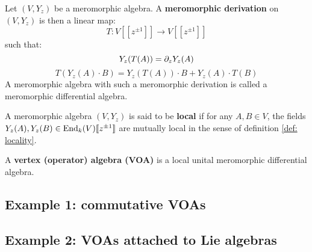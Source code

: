         \begin{definition} \label{def: meromorphic_differential_algebras}
            Let $(V, Y_z)$ be a meromorphic algebra. A \textbf{meromorphic derivation} on $(V, Y_z)$ is then a linear map:
                $$T: V[\![z^{\pm 1}]\!] \to V[\![z^{\pm 1}]\!]$$
            such that:
                $$Y_z( T(A) ) = \partial_z Y_z(A)$$
                $$T( Y_z(A) \cdot B ) = Y_z( T(A) ) \cdot B + Y_z(A) \cdot T(B)$$
            A meromorphic algebra with such a meromorphic derivation is called a meromorphic differential algebra.
        \end{definition}
        \begin{definition} \label{def: local_meromorphic_algebras}
            A meromorphic algebra $(V, Y_z)$ is said to be \textbf{local} if for any $A, B \in V$, the fields $Y_z(A), Y_z(B) \in \operatorname{End}_k(V)[\![z^{\pm 1}]\!]$ are mutually local in the sense of definition \ref{def: locality}.
        \end{definition}

        \begin{definition}[VOAs] \label{def: VOAs}
            A \textbf{vertex (operator) algebra (VOA)} is a local unital meromorphic differential algebra.
        \end{definition}

    \subsection{Example 1: commutative VOAs}

    \subsection{Example 2: VOAs attached to Lie algebras}